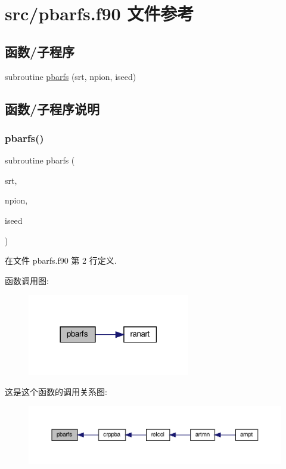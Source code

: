 \hypertarget{pbarfs_8f90}{}\section{src/pbarfs.f90 文件参考}
\label{pbarfs_8f90}
\subsection*{函数/子程序}
\begin{DoxyCompactItemize}
\item 
subroutine \mbox{\hyperlink{pbarfs_8f90_ab8f6f50b4e9cb75f06e3b39329e87ee8}{pbarfs}} (srt, npion, iseed)
\end{DoxyCompactItemize}


\subsection{函数/子程序说明}
\mbox{\label{pbarfs_8f90_ab8f6f50b4e9cb75f06e3b39329e87ee8}} 
\subsubsection{\texorpdfstring{pbarfs()}{pbarfs()}}
{\footnotesize\ttfamily subroutine pbarfs (\begin{DoxyParamCaption}\item[{}]{srt,  }\item[{}]{npion,  }\item[{}]{iseed }\end{DoxyParamCaption})}



在文件 pbarfs.\+f90 第 2 行定义.

函数调用图\+:
\nopagebreak
\begin{figure}[H]
\begin{center}
\leavevmode
\includegraphics[width=201pt]{pbarfs_8f90_ab8f6f50b4e9cb75f06e3b39329e87ee8_cgraph}
\end{center}
\end{figure}
这是这个函数的调用关系图\+:
\nopagebreak
\begin{figure}[H]
\begin{center}
\leavevmode
\includegraphics[width=350pt]{pbarfs_8f90_ab8f6f50b4e9cb75f06e3b39329e87ee8_icgraph}
\end{center}
\end{figure}
